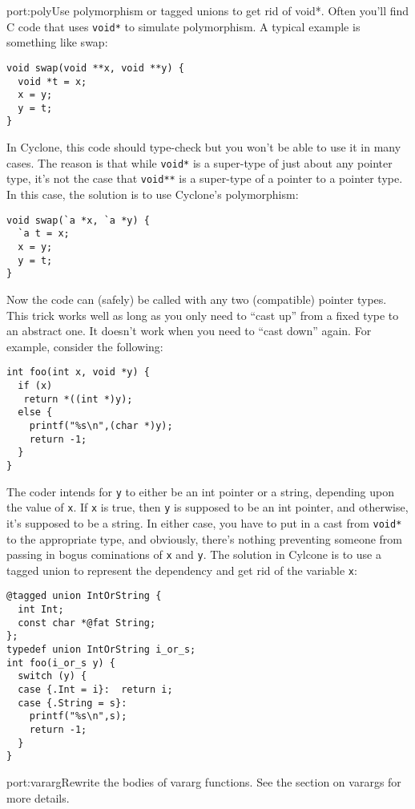 \begin{porta}{port:poly}{Use polymorphism or tagged unions to get rid of void*.}  
Often you'll find C code that uses \texttt{void*} to simulate
polymorphism.  A typical example is something like swap:
\begin{verbatim}
void swap(void **x, void **y) {
  void *t = x;
  x = y;
  y = t;
}
\end{verbatim}

In Cyclone, this code should type-check but you won't be able
to use it in many cases.  The reason is that while \texttt{void*}
is a super-type of just about any pointer type, it's not the
case that \texttt{void**} is a super-type of a pointer to a
pointer type.  In this case, the solution is to use Cyclone's
polymorphism:
\begin{verbatim}
void swap(`a *x, `a *y) {
  `a t = x;
  x = y;
  y = t;
}
\end{verbatim}

Now the code can (safely) be called with any two (compatible)
pointer types.  This trick works well as long as you only need
to ``cast up'' from a fixed type to an abstract one.  It doesn't
work when you need to ``cast down'' again.  For example, consider
the following:
\begin{verbatim}
int foo(int x, void *y) {
  if (x)
   return *((int *)y);
  else {
    printf("%s\n",(char *)y);
    return -1;
  }
}
\end{verbatim}

The coder intends for \texttt{y} to either be an int pointer or
a string, depending upon the value of \texttt{x}.  If \texttt{x}
is true, then \texttt{y} is supposed to be an int pointer, and
otherwise, it's supposed to be a string.  In either case, you have
to put in a cast from \texttt{void*} to the appropriate type,
and obviously, there's nothing preventing someone from passing
in bogus cominations of \texttt{x} and \texttt{y}.  The solution
in Cylcone is to use a tagged union to represent the dependency
and get rid of the variable \texttt{x}:
\begin{verbatim}
@tagged union IntOrString { 
  int Int;
  const char *@fat String;
};
typedef union IntOrString i_or_s;
int foo(i_or_s y) {
  switch (y) {
  case {.Int = i}:  return i;
  case {.String = s}:  
    printf("%s\n",s);
    return -1;
  }
}
\end{verbatim}
\end{porta}

\begin{porta}{port:vararg}{Rewrite the bodies of vararg functions.}
See the section on varargs for more details.  
\end{porta}

